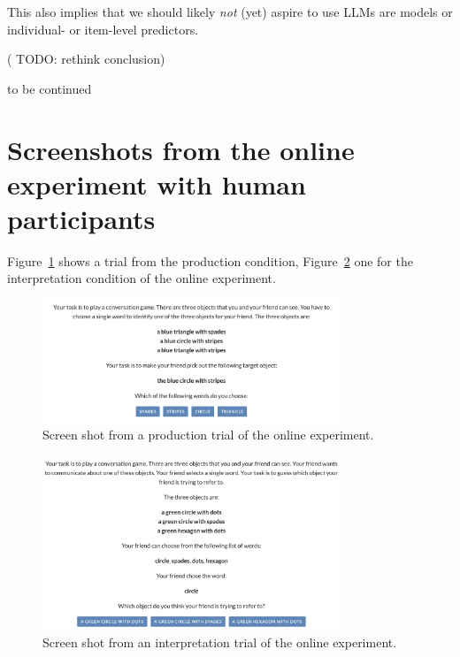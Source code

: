 \documentclass[fleqn]{article}
\begin{document}
This also implies that we should likely \emph{not} (yet) aspire to use
LLMs are models or individual- or item-level predictors.

( {TODO: rethink conclusion})

{to be continued}

\newpage
\appendix


\section{Screenshots from the online experiment with human participants}
\label{sec:scre-from-online}

Figure~\ref{fig:refgame-screenshot-production} shows a trial from the production condition, Figure~\ref{fig:refgame-screenshot-interpretation} one for the interpretation condition of the online experiment.

\begin{figure}[H]
  \centering
  \includegraphics[width = 0.8\textwidth]{00-pics/refgame-production.png}

  \caption{Screen shot from a production trial of the online experiment.}
  \label{fig:refgame-screenshot-production}
\end{figure}

\begin{figure}[H]
  \centering
  \includegraphics[width = 0.8\textwidth]{00-pics/refgame-interpretation.png}

  \caption{Screen shot from an interpretation trial of the online experiment.}
  \label{fig:refgame-screenshot-interpretation}
\end{figure}
\end{document}
